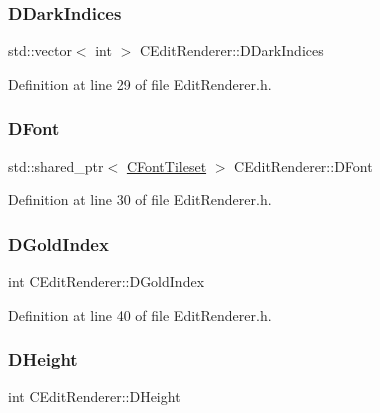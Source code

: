 \subsubsection{\texorpdfstring{D\+Dark\+Indices}{DDarkIndices}}
{\footnotesize\ttfamily std\+::vector$<$ int $>$ C\+Edit\+Renderer\+::\+D\+Dark\+Indices\hspace{0.3cm}{\ttfamily [protected]}}



Definition at line 29 of file Edit\+Renderer.\+h.

\hypertarget{classCEditRenderer_afd108ae6cb3e9eeffce881a1ada0f0db}{}\label{classCEditRenderer_afd108ae6cb3e9eeffce881a1ada0f0db} 
\subsubsection{\texorpdfstring{D\+Font}{DFont}}
{\footnotesize\ttfamily std\+::shared\+\_\+ptr$<$ \hyperlink{classCFontTileset}{C\+Font\+Tileset} $>$ C\+Edit\+Renderer\+::\+D\+Font\hspace{0.3cm}{\ttfamily [protected]}}



Definition at line 30 of file Edit\+Renderer.\+h.

\hypertarget{classCEditRenderer_adef6e0cd1cc67b18a196bbac95a7306b}{}\label{classCEditRenderer_adef6e0cd1cc67b18a196bbac95a7306b} 
\subsubsection{\texorpdfstring{D\+Gold\+Index}{DGoldIndex}}
{\footnotesize\ttfamily int C\+Edit\+Renderer\+::\+D\+Gold\+Index\hspace{0.3cm}{\ttfamily [protected]}}



Definition at line 40 of file Edit\+Renderer.\+h.

\hypertarget{classCEditRenderer_ade8dedb4f9790d28b38da8ef20a171cb}{}\label{classCEditRenderer_ade8dedb4f9790d28b38da8ef20a171cb} 
\subsubsection{\texorpdfstring{D\+Height}{DHeight}}
{\footnotesize\ttfamily int C\+Edit\+Renderer\+::\+D\+Height\hspace{0.3cm}{\ttfamily [protected]}}



